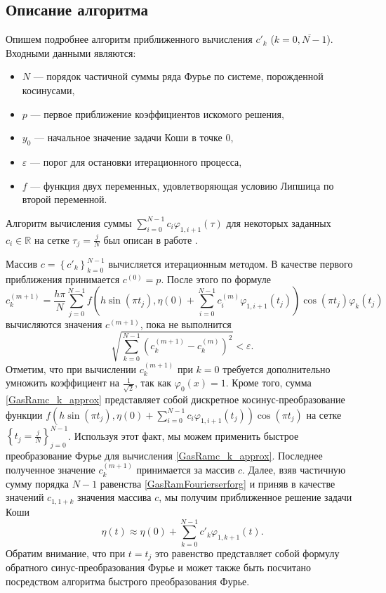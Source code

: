 \subsection{Описание алгоритма}
Опишем подробнее алгоритм приближенного вычисления $c'_k$ ($k=\overline{0, N-1}$).
Входными данными являются:
\begin{itemize}
	\item
	$N$ --- порядок частичной суммы ряда Фурье по системе, порожденной косинусами,
	\item
	$p$ --- первое приближение коэффициентов искомого решения,
	\item
	$y_0$ --- начальное значение задачи Коши в точке 0,
	\item
	$\varepsilon$ --- порог для остановки итерационного процесса,
	\item
	$f$ --- функция двух переменных, удовлетворяющая условию Липшица по второй переменной.
\end{itemize}
Алгоритм вычисления суммы
$\sum_{i=0}^{N-1} c_{i}\varphi_{1,i+1}(\tau)$ для некоторых заданных $c_i \in \mathbb{R}$ на сетке $\tau_j = \frac{j}{N}$ был описан в работе  \cite{AGG_GRM}.

Массив $c = \left\{c'_k\right\}_{k=0}^{N-1}$ вычисляется итерационным методом. В качестве первого приближения принимается $c^{(0)} = p$. После этого по формуле
\begin{equation} \label{GasRamc_k_approx}
	c^{(m+1)}_k = \frac{h\pi}N \sum_{j=0}^{N-1} f\left(h\sin (\pi t_j), \eta(0) + \sum_{i=0}^{N-1} c^{(m)}_{i}\varphi_{1,i+1}(t_j)\right) \cos (\pi t_j) \varphi_k(t_j)
\end{equation}
вычисляются значения $c^{(m+1)}$, пока не выполнится
\begin{equation*}
	\sqrt{\sum_{k=0}^{N-1} (c_k^{(m+1)} - c_k^{(m)} )^2} < \varepsilon.
\end{equation*}
Отметим, что при вычислении $c^{(m+1)}_k$ при $k=0$ требуется дополнительно умножить коэффициент на $\frac{1}{\sqrt{2}}$, так как $\varphi_0(x) = 1$.
Кроме того, сумма \eqref{GasRamc_k_approx} представляет собой дискретное косинус-преобразование функции $f\left(h\sin (\pi t_j), \eta(0) + \sum_{i=0}^{N-1} c_{i}\varphi_{1,i+1}(t_j)\right) \cos (\pi t_j)$ на сетке $\left\{t_j = \frac{j}{N}\right\}_{j=0}^{N-1}$. Используя этот факт, мы можем применить быстрое преобразование Фурье для вычисления \eqref{GasRamc_k_approx}.
Последнее полученное значение $c_k^{(m+1)}$ принимается за массив $c$. Далее, взяв частичную сумму порядка $N-1$ равенства \eqref{GasRamFourierserforg} и приняв в качестве значений $c_{1,1+k}$ значения массива $c$, мы получим приближенное решение задачи Коши
\begin{equation*}
	\eta(t) \approx \eta(0) + \sum_{k=0}^{N-1} c'_k \varphi_{1,k+1} (t).
\end{equation*}
Обратим внимание, что при $t = t_j$ это равенство представляет собой формулу обратного синус-преобразования Фурье и может также быть посчитано посредством алгоритма быстрого преобразования Фурье.

